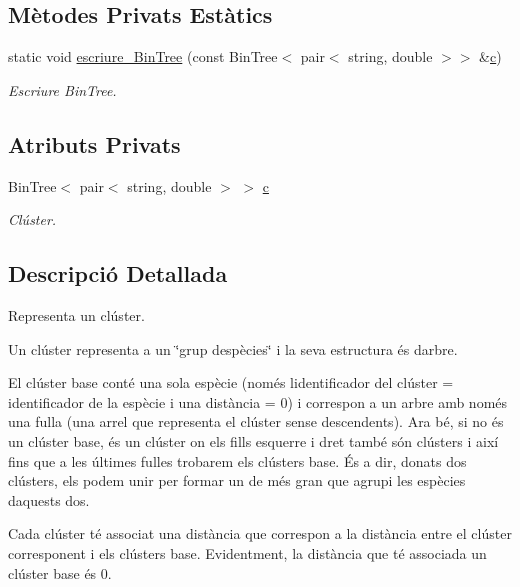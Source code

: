 \subsection*{Mètodes Privats Estàtics}
\begin{DoxyCompactItemize}
\item 
static void \hyperlink{class_cluster_ac42a9b07faa929e29d7cfa1c334544fc}{escriure\+\_\+\+Bin\+Tree} (const Bin\+Tree$<$ pair$<$ string, double $>$$>$ \&\hyperlink{class_cluster_a1a623435b5ec16328059c9300fa0dfaa}{c})
\begin{DoxyCompactList}\small\item\em Escriure Bin\+Tree. \end{DoxyCompactList}\end{DoxyCompactItemize}
\subsection*{Atributs Privats}
\begin{DoxyCompactItemize}
\item 
Bin\+Tree$<$ pair$<$ string, double $>$ $>$ \hyperlink{class_cluster_a1a623435b5ec16328059c9300fa0dfaa}{c}
\begin{DoxyCompactList}\small\item\em Clúster. \end{DoxyCompactList}\end{DoxyCompactItemize}


\subsection{Descripció Detallada}
Representa un clúster. 

Un clúster representa a un \char`\"{}grup d\textquotesingle{}espècies\char`\"{} i la seva estructura és d\textquotesingle{}arbre.

El clúster base conté una sola espècie (només l\textquotesingle{}identificador del clúster = identificador de la espècie i una distància = 0) i correspon a un arbre amb només una fulla (una arrel que representa el clúster sense descendents). Ara bé, si no és un clúster base, és un clúster on els fills esquerre i dret també són clústers i així fins que a les últimes fulles trobarem els clústers base. És a dir, donats dos clústers, els podem unir per formar un de més gran que agrupi les espècies d\textquotesingle{}aquests dos.

Cada clúster té associat una distància que correspon a la distància entre el clúster corresponent i els clústers base. Evidentment, la distància que té associada un clúster base és 0.

